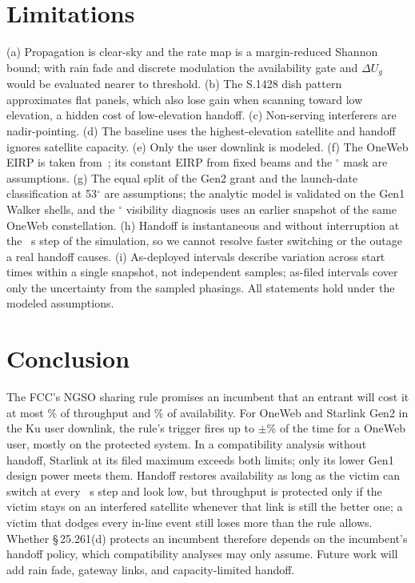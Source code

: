 \documentclass[conference]{IEEEtran}
\begin{document}
\section{Limitations}
(a) Propagation is clear-sky and the rate map is a margin-reduced Shannon bound;
with rain fade and discrete modulation the availability gate and $\Delta U_g$ would
be evaluated nearer to threshold. (b) The S.1428 dish pattern approximates flat
panels, which also lose gain when scanning toward low elevation, a hidden cost of
low-elevation handoff. (c) Non-serving interferers are nadir-pointing. (d) The
baseline uses the highest-elevation satellite and handoff ignores satellite
capacity. (e) Only the user downlink is modeled. (f) The OneWeb EIRP is taken
from~\cite{delportillo2019}; its constant EIRP from fixed beams and the
\StationMinElevDeg$^\circ$ mask are assumptions. (g) The equal split of the Gen2
grant and the launch-date classification at 53$^\circ$ are assumptions;
the analytic model is validated on the Gen1 Walker shells, and the
\OnewebMinElevSensDeg$^\circ$ visibility diagnosis uses an earlier snapshot of the
same OneWeb constellation. (h) Handoff is instantaneous and without interruption at the
\TimeStepS~s step of the simulation, so we cannot resolve faster switching or the
outage a real handoff causes. (i) As-deployed intervals describe variation across start
times within a single snapshot, not independent samples; as-filed intervals cover
only the uncertainty from the sampled phasings. All statements hold under
the modeled assumptions.

\section{Conclusion}
The FCC's NGSO sharing rule promises an incumbent that an entrant will cost it at
most \DegradeLimitPct\% of throughput and \UnavailLimitPct\% of availability. For
OneWeb and Starlink Gen2 in the Ku user downlink, the rule's trigger fires up to
\BindDepWorstPct$\pm$\BindDepWorstCi\% of the time for a OneWeb user, mostly on
the protected system. In a compatibility analysis without handoff, Starlink at its filed
maximum exceeds both limits; only its lower Gen1 design power meets them. Handoff
restores availability as long as the victim can switch at every
\TimeStepS~s step and look low, but
throughput is protected only if the victim stays on an interfered satellite
whenever that link is still the better one; a victim that dodges every in-line
event still loses more than the rule allows. Whether \S\,25.261(d) protects an incumbent therefore
depends on the incumbent's handoff policy, which compatibility analyses may only
assume. Future work will add rain fade, gateway links, and capacity-limited
handoff.
\end{document}
